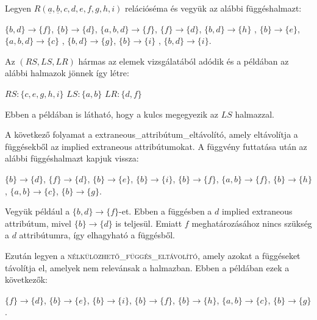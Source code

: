 \begin{pld}
Legyen $R(\underline{a},\underline{b},c,d,e,f,g,h,i)$ relációséma és vegyük az alábbi függéshalmazt:
\begin{center}
    $\{b,d\} \longrightarrow \{f\}$, 
    $\{b\} \longrightarrow \{d\}$, 
    $\{a,b,d\} \longrightarrow \{f\}$, 
    $\{f\} \longrightarrow \{d\}$, \break
    $\{b,d\} \longrightarrow \{h\}$ ,
    $\{b\} \longrightarrow \{e\}$, 
    $\{a,b,d\} \longrightarrow \{c\}$ ,
    $\{b,d\} \longrightarrow \{g\}$, \break
    $\{b\} \longrightarrow \{i\}$ ,
    $\{b,d\} \longrightarrow \{i\}$.\break
\end{center}

Az $(RS,LS,LR)$ hármas az elemek vizsgálatából adódik és a példában az alábbi halmazok jönnek így létre:

\begin{center}
    $RS: \{c,e,g,h,i\}$ \break
    $LS: \{a,b\}$\break
    $LR: \{d,f\}$
\end{center}

Ebben a példában is látható, hogy a kulcs megegyezik az $LS$ halmazzal.\par
A következő folyamat a extraneous\_attribútum\_eltávolító, amely eltávolítja a függésekből az implied extraneous attribútumokat. A függvény futtatása után az alábbi függéshalmazt kapjuk vissza:

\begin{center}
    $\{b\} \longrightarrow \{d\}$, 
    $\{f\} \longrightarrow \{d\}$, 
    $\{b\} \longrightarrow \{e\}$, 
    $\{b\} \longrightarrow \{i\}$,\break 
    $\{b\} \longrightarrow \{f\}$, 
    $\{a,b\} \longrightarrow \{f\}$, 
    $\{b\} \longrightarrow \{h\}$, 
    $\{a,b\} \longrightarrow \{c\}$, 
    $\{b\} \longrightarrow \{g\}$.
\end{center}

Vegyük például a $\{b,d\} \longrightarrow \{f\}$-et. Ebben a függésben a $d$ implied extraneous attribútum, mivel $\{b\} \longrightarrow \{d\}$ is teljesül. Emiatt $f$ meghatározásához nincs szükség a $d$ attribútumra, így elhagyható a függésből. \par

Ezután legyen a \textsc{nélkülözhető\_függés\_eltávolító}, amely azokat a függéseket távolítja el, amelyek nem relevánsak a halmazban. Ebben a példában ezek a következők:

\begin{center}
    $\{f\} \longrightarrow \{d\}$, 
    $\{b\} \longrightarrow \{e\}$, 
    $\{b\} \longrightarrow \{i\}$,
    $\{b\} \longrightarrow \{f\}$, \break 
    $\{b\} \longrightarrow \{h\}$, 
    $\{a,b\} \longrightarrow \{c\}$, 
    $\{b\} \longrightarrow \{g\}$.
\end{center}


\end{pld}
